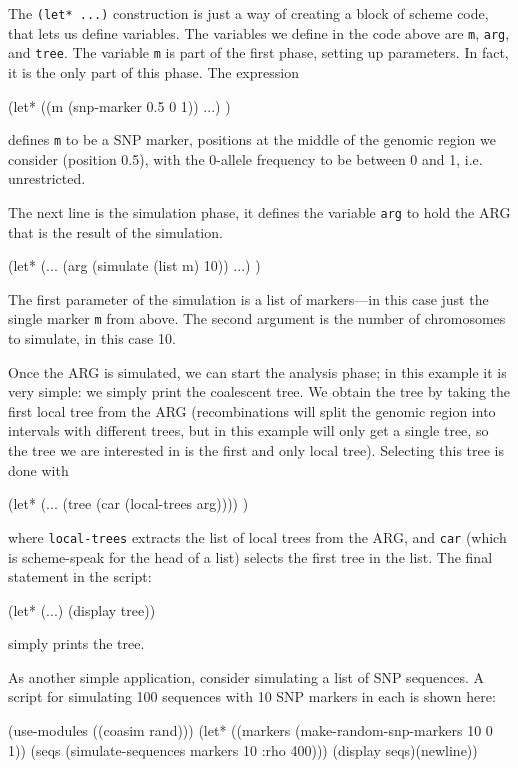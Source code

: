 \documentclass{manual}
\begin{document}
The \verb?(let* ...)? construction is just a way of creating a block
of scheme code, that lets us define variables.  The variables we
define in the code above are \texttt{m}, \texttt{arg}, and
\texttt{tree}.  The variable \texttt{m} is part of the first phase,
setting up parameters.  In fact, it is the only part of this phase.
The expression
\begin{code}
(let* ((m (snp-marker 0.5 0 1))
       ...)
  )
\end{code}
defines \texttt{m} to be a SNP marker, positions at the middle of the
genomic region we consider (position 0.5), with the 0-allele frequency
to be between 0 and 1, i.e. unrestricted.

The next line is the simulation phase, it defines the variable
\texttt{arg} to hold the ARG that is the result of the simulation.
\begin{code}
(let* (...
       (arg (simulate (list m) 10))
       ...)
  )
\end{code}

The first parameter of the simulation is a list of markers---in this
case just the single marker \texttt{m} from above.  The second
argument is the number of chromosomes to simulate, in this case 10.

Once the ARG is simulated, we can start the analysis phase; in this
example it is very simple: we simply print the coalescent tree.  We
obtain the tree by taking the first local tree from the ARG
(recombinations will split the genomic region into intervals with
different trees, but in this example will only get a single tree, so
the tree we are interested in is the first and only local tree).
Selecting this tree is done with
\begin{code}
(let* (...
       (tree (car (local-trees arg))))
  )
\end{code}
where \texttt{local-trees} extracts the list of local trees from the
ARG, and \texttt{car} (which is scheme-speak for the head of a list)
selects the first tree in the list.  The final statement in the script:
\begin{code}
(let* (...)
  (display tree))
\end{code}
simply prints the tree.


As another simple application, consider simulating a list of SNP
sequences.  A script for simulating 100 sequences with 10 SNP markers
in each is shown here:
\begin{code}
(use-modules ((coasim rand)))
(let* ((markers (make-random-snp-markers 10 0 1))
       (seqs (simulate-sequences markers 10 :rho 400)))
  (display seqs)(newline))
\end{code}
\end{document}
